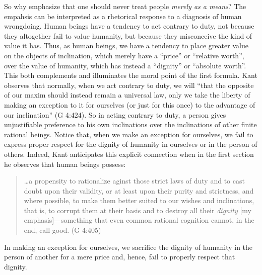 So why emphasize that one should never treat people \emph{merely as a means}? The empahsis can be interpreted as a rhetorical response to a diagnosis of human wrongdoing. Human beings have a tendency to act contrary to duty, not because they altogether fail to value humanity, but because they misconceive the kind of value it has. Thus, as human beings, we have a tendency to place greater value on the objects of inclination, which merely have a ``price'' or ``relative worth'', over the value of humanity, which has instead a ``dignity'' or ``absolute worth''. This both complements and illuminates the moral point of the first formula. Kant observes that normally, when we act contrary to duty, we will ``that the opposite of our maxim should instead remain a universal law, only we take the liberty of making an exception to it for ourselves (or just for this once) to the advantage of our inclination'' (G 4:424). So in acting contrary to duty, a person gives unjustifiable preference to his own inclinations over the inclinations of other finite rational beings. Notice that, when we make an exception for ourselves, we fail to express proper respect for the dignity of humanity in ourselves or in the person of others. Indeed, Kant anticipates this explicit connection when in the first section he observes that human beings possess:
\begin{quote}
	\ldots a propensity to rationalize aginst those strict laws of duty and to cast doubt upon their validity, or at least upon their purity and strictness, and where possible, to make them better suited to our wishes and inclinations, that is, to corrupt them at their basis and to destroy all their \emph{dignity} [my emphasis]---something that even common rational cognition cannot, in the end, call good. (G 4:405)
\end{quote}

In making an exception for ourselves, we sacrifice the dignity of humanity in the person of another for a mere price and, hence, fail to properly respect that dignity. \change

